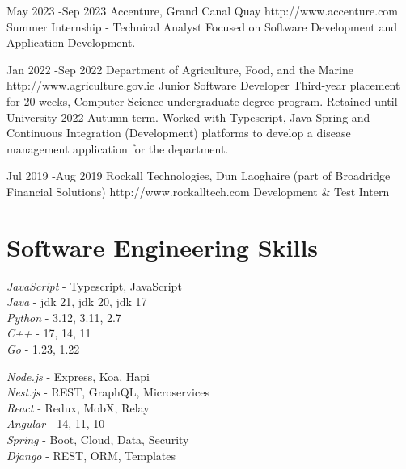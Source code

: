 \documentclass[10pt]{article} %
\begin{document}

\job
{May 2023 -}{Sep 2023} {Accenture, Grand Canal Quay} {http://www.accenture.com}
{Summer Internship - Technical Analyst} {Focused on Software Development and
Application Development.}


\job
{Jan 2022 -}{Sep 2022} {Department of Agriculture, Food, and the Marine}
{http://www.agriculture.gov.ie} {Junior Software Developer} {Third-year
placement for 20 weeks, Computer Science undergraduate degree program. Retained
until University 2022 Autumn term. Worked with Typescript, Java Spring and
Continuous Integration (Development) platforms to develop a disease management
application for the department.}


\job
{Jul 2019 -}{Aug 2019} {Rockall Technologies, Dun Laoghaire (part of Broadridge
Financial Solutions)} {http://www.rockalltech.com} {Development \& Test Intern}
{}




\section{Software Engineering Skills}

{ \textit{JavaScript} - Typescript, JavaScript\\
    \textit{Java} - jdk 21, jdk 20, jdk 17\\
    \textit{Python} - 3.12, 3.11, 2.7\\
    \textit{C++} - 17, 14, 11\\
    \textit{Go} - 1.23, 1.22\\
}


{ \textit{Node.js} - Express, Koa, Hapi\\
    \textit{Nest.js} - REST, GraphQL, Microservices\\
    \textit{React} - Redux, MobX, Relay\\
    \textit{Angular} - 14, 11, 10\\
    \textit{Spring} - Boot, Cloud, Data, Security\\
    \textit{Django} - REST, ORM, Templates\\
}
\end{document}
